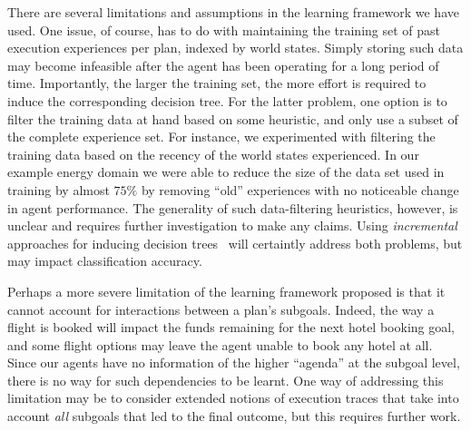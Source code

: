 There are several limitations and assumptions in the learning framework we have used.
One issue, of course, has to do with maintaining the training set of past execution experiences per plan, indexed by world states. Simply storing such data may become infeasible after the agent has been operating for a long period of time. Importantly, the larger the training set, the more effort is required to induce the corresponding decision tree. For the latter problem, one option is to filter the training data at hand based on some heuristic, and only use a subset of the complete experience set. For instance, we experimented with filtering the training data based on the recency of the world states experienced. In our example energy domain we were able to reduce the size of the data set used in training by almost $75\%$ by removing ``old'' experiences with no noticeable change in agent performance. The generality of such data-filtering heuristics, however, is unclear and requires further investigation to make any claims. Using \emph{incremental} approaches for inducing decision trees~\cite{Swere06:Fast,Utgoff97Decision} will certaintly address both problems, but may impact classification accuracy.




Perhaps a more severe limitation of the learning framework proposed is that it cannot account for interactions between a plan's subgoals. Indeed, the way a flight is booked will impact the funds remaining for the next hotel booking goal, and  some flight options may leave the agent unable to book any hotel at all. Since our agents have no information of the higher ``agenda'' at the subgoal level, there is no way for such dependencies to be learnt. One way of addressing this limitation may be to consider extended notions of execution traces that take into account \emph{all} subgoals that led to the final outcome, but this requires further work.




